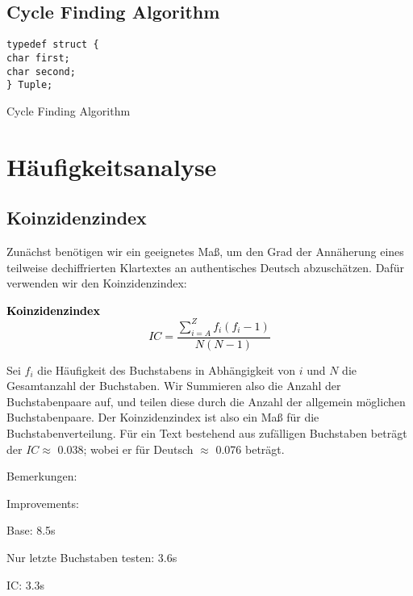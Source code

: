 \documentclass[ngerman, a4paper, footsepline, headsepline]{scrreport}
\newcommand{\fmbox}[1]{
	\begin{center}
		\fcolorbox{black}{yellow}
		{\parbox{0.88\textwidth}
			{\textcolor{black}
				{#1}
			}
		}
	\end{center}
}
\begin{document}
	\section{Cycle Finding Algorithm}
	\noindent
	\texttt{typedef struct \{} \\
	\hspace*{0.5cm} \texttt{char first;} \\
	\hspace*{0.5cm} \texttt{char second;} \\
	\texttt{\} Tuple;}
		\begin{algorithm}
			\caption{Cycle Finding Algorithm}
			\begin{algorithmic}[1]
				\EndProcedure
			\end{algorithmic}
		\end{algorithm}
	
	
	
	\chapter{Häufigkeitsanalyse}
	\section{Koinzidenzindex}
	\thispagestyle{scrheadings}
	
	Zunächst benötigen wir ein geeignetes Maß, um den Grad der Annäherung eines teilweise dechiffrierten Klartextes an authentisches Deutsch abzuschätzen. Dafür verwenden wir den Koinzidenzindex:
	
	\fmbox{\textbf{Koinzidenzindex}$$IC = \frac{\sum_{i=A}^{Z}f_i(f_i-1)}{N(N-1)}$$}

	
	Sei $f_i$ die Häufigkeit des Buchstabens in Abhängigkeit von $i$ und $N$ die Gesamtanzahl der Buchstaben. Wir Summieren also die Anzahl der Buchstabenpaare auf, und teilen diese durch die Anzahl der allgemein möglichen Buchstabenpaare. Der Koinzidenzindex ist also ein Maß für die Buchstabenverteilung. Für ein Text bestehend aus zufälligen Buchstaben beträgt der $IC \approx$ 0.038; wobei er für Deutsch $\approx$ 0.076 beträgt.
	\newpage
	
	Bemerkungen:
	
	Improvements:
	
	Base: 8.5s
	
	Nur letzte Buchstaben testen: 3.6s
	
	IC: 3.3s
	
\end{document}
